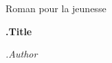 \begin{titlepage}
  \centering
	Roman pour la jeunesse
  \vfill
	\begin{sffamily}
	{\huge\bfseries {{ .Title }}\par}
	\vspace{1cm}
	{\Large\itshape {{ .Author }}\par}
	\vfill
	\end{sffamily}
\end{titlepage}
